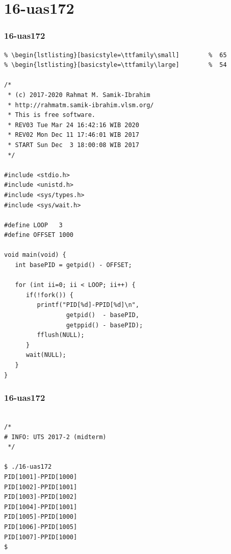 \documentclass[xcolor=table, notheorems, hyperref={pdfpagelabels=false}]{beamer}
\begin{document}
\section{16-uas172}
\begin{frame}[fragile]
\frametitle{16-uas172}
\begin{lstlisting}[basicstyle=\ttfamily\tiny]         % 108
% \begin{lstlisting}[basicstyle=\ttfamily\footnotesize] %  72
% \begin{lstlisting}[basicstyle=\ttfamily\small]        %  65
% \begin{lstlisting}[basicstyle=\ttfamily\large]        %  54

/*
 * (c) 2017-2020 Rahmat M. Samik-Ibrahim
 * http://rahmatm.samik-ibrahim.vlsm.org/
 * This is free software.
 * REV03 Tue Mar 24 16:42:16 WIB 2020
 * REV02 Mon Dec 11 17:46:01 WIB 2017
 * START Sun Dec  3 18:00:08 WIB 2017
 */

#include <stdio.h>
#include <unistd.h>
#include <sys/types.h>
#include <sys/wait.h>

#define LOOP   3
#define OFFSET 1000

void main(void) {
   int basePID = getpid() - OFFSET;

   for (int ii=0; ii < LOOP; ii++) {
      if(!fork()) {
         printf("PID[%d]-PPID[%d]\n", 
                 getpid()  - basePID, 
                 getppid() - basePID);
         fflush(NULL);
      }
      wait(NULL);
   }
}

\end{lstlisting}
\end{frame}

\begin{frame}[fragile]
\frametitle{16-uas172}
\begin{lstlisting}[basicstyle=\ttfamily\large]        %  54

/*
# INFO: UTS 2017-2 (midterm)
 */

$ ./16-uas172 
PID[1001]-PPID[1000]
PID[1002]-PPID[1001]
PID[1003]-PPID[1002]
PID[1004]-PPID[1001]
PID[1005]-PPID[1000]
PID[1006]-PPID[1005]
PID[1007]-PPID[1000]
$ 

\end{lstlisting}
\end{frame}
\end{document}
